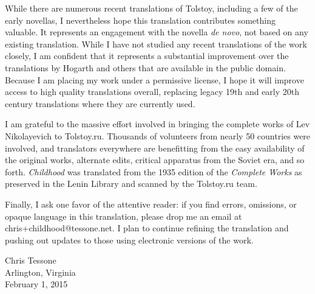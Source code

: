 While there are numerous recent translations of Tolstoy, including a few of the early novellas, I nevertheless hope this translation contributes something valuable. It represents an engagement with the novella \textit{de novo}, not based on any existing translation. While I have not studied any recent translations of the work closely, I am confident that it represents a substantial improvement over the translations by Hogarth and others that are available in the public domain. Because I am placing my work under a permissive license, I hope it will improve access to high quality translations overall, replacing legacy 19th and early 20th century translations where they are currently used.

I am grateful to the massive effort involved in bringing the complete works of Lev Nikolayevich to Tolstoy.ru. Thousands of volunteers from nearly 50 countries were involved, and translators everywhere are benefitting from the easy availability of the original works, alternate edits, critical apparatus from the Soviet era, and so forth. \textit{Childhood} was translated from the 1935 edition of the \textit{Complete Works} as preserved in the Lenin Library and scanned by the Tolstoy.ru team.

Finally, I ask one favor of the attentive reader: if you find errors, omissions, or opaque language in this translation, please drop me an email at chris+childhood@tessone.net. I plan to continue refining the translation and pushing out updates to those using electronic versions of the work.

\begin{flushright}
Chris Tessone\\
Arlington, Virginia\\
February 1, 2015
\end{flushright}
